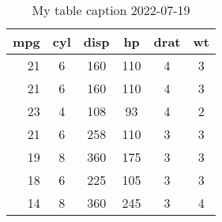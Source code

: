 \begin{table}[p]
\centering
\caption{My table caption 2022-07-19} 
\begin{tabular}{r|c|cccc}
  \hline
mpg & cyl & disp & hp & drat & wt \\ 
  \hline
21 & 6 & 160 & 110 & 4 & 3 \\ 
  21 & 6 & 160 & 110 & 4 & 3 \\ 
  23 & 4 & 108 & 93 & 4 & 2 \\ 
  21 & 6 & 258 & 110 & 3 & 3 \\ 
  19 & 8 & 360 & 175 & 3 & 3 \\ 
  18 & 6 & 225 & 105 & 3 & 3 \\ 
  14 & 8 & 360 & 245 & 3 & 4 \\ 
   \hline
\end{tabular}
\end{table}
